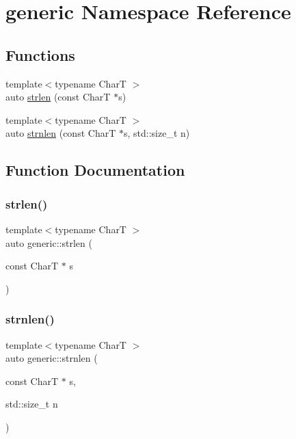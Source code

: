 \hypertarget{namespacegeneric}{}\section{generic Namespace Reference}
\label{namespacegeneric}
\subsection*{Functions}
\begin{DoxyCompactItemize}
\item 
{\footnotesize template$<$typename CharT $>$ }\\auto \hyperlink{namespacegeneric_a6fbb3876f0a436582b71a767d4628acb}{strlen} (const CharT $\ast$s)
\item 
{\footnotesize template$<$typename CharT $>$ }\\auto \hyperlink{namespacegeneric_a281b3d22cc3274d678d8a12ad43d7def}{strnlen} (const CharT $\ast$s, std\+::size\+\_\+t n)
\end{DoxyCompactItemize}


\subsection{Function Documentation}
\mbox{\label{namespacegeneric_a6fbb3876f0a436582b71a767d4628acb}} 
\subsubsection{\texorpdfstring{strlen()}{strlen()}}
{\footnotesize\ttfamily template$<$typename CharT $>$ \\
auto generic\+::strlen (\begin{DoxyParamCaption}\item[{const CharT $\ast$}]{s }\end{DoxyParamCaption})}

\mbox{\label{namespacegeneric_a281b3d22cc3274d678d8a12ad43d7def}} 
\subsubsection{\texorpdfstring{strnlen()}{strnlen()}}
{\footnotesize\ttfamily template$<$typename CharT $>$ \\
auto generic\+::strnlen (\begin{DoxyParamCaption}\item[{const CharT $\ast$}]{s,  }\item[{std\+::size\+\_\+t}]{n }\end{DoxyParamCaption})}

